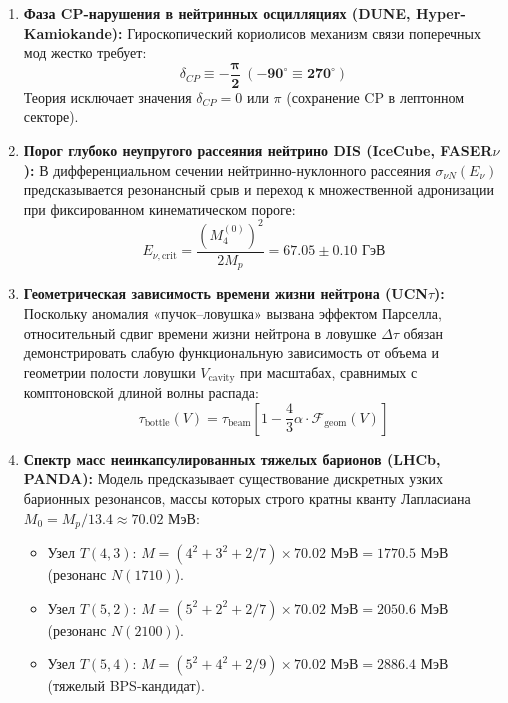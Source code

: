 \documentclass[12pt,a4paper]{article}
\begin{document}
\begin{enumerate}
	\item \textbf{Фаза CP-нарушения в нейтринных осцилляциях (DUNE, Hyper-Kamiokande):}
	Гироскопический кориолисов механизм связи поперечных мод жестко требует:
	\begin{equation}
		\delta_{CP} \equiv \mathbf{-\frac{\pi}{2} \ (-90^\circ \equiv 270^\circ)}
	\end{equation}
	Теория исключает значения $\delta_{CP} = 0$ или $\pi$ (сохранение CP в лептонном секторе).
	
	\item \textbf{Порог глубоко неупругого рассеяния нейтрино DIS (IceCube, FASER$\nu$):}
	В дифференциальном сечении нейтринно-нуклонного рассеяния $\sigma_{\nu N}(E_\nu)$ предсказывается резонансный срыв и переход к множественной адронизации при фиксированном кинематическом пороге:
	\begin{equation}
		E_{\nu, \text{crit}} = \frac{(M_4^{(0)})^2}{2 M_p} = \mathbf{67.05 \pm 0.10 \text{ ГэВ}}
	\end{equation}
	
	\item \textbf{Геометрическая зависимость времени жизни нейтрона (UCN$\tau$):}
	Поскольку аномалия «пучок--ловушка» вызвана эффектом Парселла, относительный сдвиг времени жизни нейтрона в ловушке $\Delta\tau$ обязан демонстрировать слабую функциональную зависимость от объема и геометрии полости ловушки $V_{\text{cavity}}$ при масштабах, сравнимых с комптоновской длиной волны распада:
	\begin{equation}
		\tau_{\text{bottle}}(V) = \tau_{\text{beam}} \left[ 1 - \frac{4}{3}\alpha \cdot \mathcal{F}_{\text{geom}}(V) \right]
	\end{equation}
	
	\item \textbf{Спектр масс неинкапсулированных тяжелых барионов (LHCb, PANDA):}
	Модель предсказывает существование дискретных узких барионных резонансов, массы которых строго кратны кванту Лапласиана $M_0 = M_p / 13.4 \approx 70.02$ МэВ:
	\begin{itemize}
		\item Узел $T(4,3)$: $M = (4^2 + 3^2 + 2/7) \times 70.02 \text{ МэВ} = \mathbf{1770.5 \text{ МэВ}}$ (резонанс $N(1710)$).
		\item Узел $T(5,2)$: $M = (5^2 + 2^2 + 2/7) \times 70.02 \text{ МэВ} = \mathbf{2050.6 \text{ МэВ}}$ (резонанс $N(2100)$).
		\item Узел $T(5,4)$: $M = (5^2 + 4^2 + 2/9) \times 70.02 \text{ МэВ} = \mathbf{2886.4 \text{ МэВ}}$ (тяжелый BPS-кандидат).
	\end{itemize}
\end{enumerate}
\end{document}
